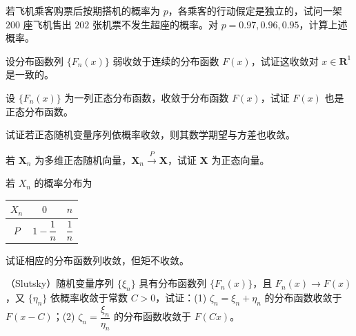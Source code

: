 \documentclass[../../main.tex]{subfiles}
\begin{document}
\begin{exercise}\label{exercise:ch05-19}
若飞机乘客购票后按期搭机的概率为 $p$，各乘客的行动假定是独立的，试问一架 $200$ 座飞机售出 $202$ 张机票不发生超座的概率。对 $p=0.97,0.96,0.95$，计算上述概率。
\end{exercise}

\begin{exercise}\label{exercise:ch05-20}
设分布函数列 $\{F_n(x)\}$ 弱收敛于连续的分布函数 $F(x)$，试证这收敛对 $x\in\mathbf{R}^{1}$ 是一致的。
\end{exercise}

\begin{exercise}\label{exercise:ch05-21}
设 $\{F_n(x)\}$ 为一列正态分布函数，收敛于分布函数 $F(x)$，试证 $F(x)$ 也是正态分布函数。
\end{exercise}

\begin{exercise}\label{exercise:ch05-22}
试证若正态随机变量序列依概率收敛，则其数学期望与方差也收敛。
\end{exercise}

\begin{exercise}\label{exercise:ch05-23}
若 $\bm{X}_n$ 为多维正态随机向量，$\bm{X}_n\xrightarrow{P}\bm{X}$，试证 $\bm{X}$ 为正态向量。
\end{exercise}

\begin{exercise}\label{exercise:ch05-24}
若 $X_n$ 的概率分布为
\begin{center}
\begin{tabular}{c|cc}
$X_n$ & $0$ & $n$\\ \hline
$P$ & $1-\dfrac1n$ & $\dfrac1n$
\end{tabular}
\end{center}
试证相应的分布函数列收敛，但矩不收敛。
\end{exercise}

\begin{exercise}\label{exercise:ch05-25}
（Slutsky）随机变量序列 $\{\xi_n\}$ 具有分布函数列 $\{F_n(x)\}$，且 $F_n(x)\to F(x)$，又 $\{\eta_n\}$ 依概率收敛于常数 $C>0$，试证：(1) $\zeta_n=\xi_n+\eta_n$ 的分布函数收敛于 $F(x-C)$；(2) $\zeta_n=\dfrac{\xi_n}{\eta_n}$ 的分布函数收敛于 $F(Cx)$。
\end{exercise}
\end{document}
